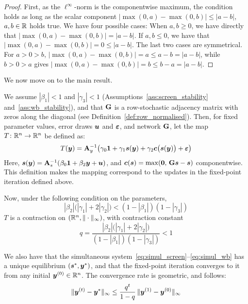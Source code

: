 \begin{proof}
    First, as the $\ell^\infty$-norm is the componentwise maximum, the condition holds as long as the scalar component $|\max(0,a) - \max(0,b)| \leq |a - b|$, $a, b \in \mathbb{R}$ holds true. We have four possible cases:
    When $a, b \geq 0$, we have directly that $|\max(0,a) - \max(0,b)| = |a - b|$. If $a, b \leq 0$, we have that $|\max(0,a) - \max(0,b)| = 0 \leq |a - b|$. The last two cases are symmetrical. For $a > 0 > b$, $|\max(0,a) - \max(0,b)| = a \leq a - b = |a - b|$, while $b > 0 > a$ gives $|\max(0,a) - \max(0,b)| = b \leq b - a = |a - b|$.
\end{proof}

We now move on to the main result.

\begin{proposition}
\label{prop:contraction}
We assume $|\beta_1| < 1$ and $|\gamma_3| < 1$ (Assumptions~\ref{ass:screen_stability} and~\ref{ass:wb_stability}), and that $\mathbf{G}$ is a row-stochastic adjacency matrix with zeros along the diagonal (see Definition~\ref{def:row_normalised}). Then, for fixed parameter values, error draws $\bm{u}$ and $\bm{\varepsilon}$, and network $\mathbf{G}$, let the map $T \colon \mathbb{R}^n \to \mathbb{R}^n$ be defined as:
\begin{equation}
\label{eq:fp_map}
    T(\bm{y}) = \mathbf{A}_y^{-1}\bigl(\gamma_0\bm{1} + \gamma_1\bm{s}(\bm{y}) + \gamma_2\bm{c}\bigl(\bm{s}(\bm{y})\bigr) + \bm{\varepsilon}\bigr)
\end{equation}
Here, $\bm{s}(\bm{y}) = \mathbf{A}_s^{-1}(\beta_0\bm{1} + \beta_2\bm{y} + \bm{u})$, and $\bm{c}(\bm{s}) = \max(\bm{0},\, \mathbf{G}\bm{s} - \bm{s})$ componentwise. This definition makes the mapping correspond to the updates in the fixed-point iteration defined above.

Now, under the following condition on the parameters,
\begin{equation}
\label{eq:contraction_condition}
    |\beta_2|\bigl(|\gamma_1| + 2|\gamma_2|\bigr) < (1 - |\beta_1|)(1 - |\gamma_3|)
\end{equation}
$T$ is a contraction on $(\mathbb{R}^n, \|\cdot\|_\infty)$, with contraction constant
\begin{equation}
\label{eq:contraction_constant}
    q = \frac{|\beta_2|\bigl(|\gamma_1| + 2|\gamma_2|\bigr)}{(1 - |\beta_1|)(1 - |\gamma_3|)} < 1
\end{equation}

We also have that the simultaneous system~\eqref{eq:simul_screen}--\eqref{eq:simul_wb} has a unique equilibrium $(\bm{s}^*, \bm{y}^*)$, and that the fixed-point iteration converges to it from any initial $\bm{y}^{(0)} \in \mathbb{R}^n$. The convergence rate is geometric, and follows:
\begin{equation}
\label{eq:fp_convergence_rate}
    \|\bm{y}^{(t)} - \bm{y}^*\|_\infty \leq \frac{q^t}{1 - q}\,\|\bm{y}^{(1)} - \bm{y}^{(0)}\|_\infty
\end{equation}
\end{proposition}

